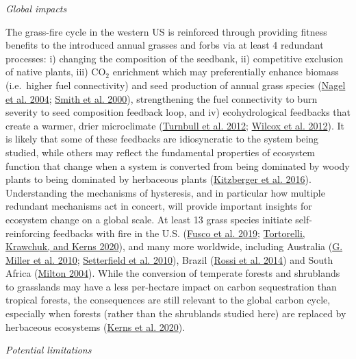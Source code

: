 \documentclass[
  12pt,
]{article}
\begin{document}
\emph{Global impacts}

The grass-fire cycle in the western US is reinforced through providing
fitness benefits to the introduced annual grasses and forbs via at least
4 redundant processes: i) changing the composition of the seedbank, ii)
competitive exclusion of native plants, iii) CO\(_2\) enrichment which
may preferentially enhance biomass (i.e.~higher fuel connectivity) and
seed production of annual grass species
(\protect\hyperlink{ref-Nagel2004}{Nagel et al. 2004};
\protect\hyperlink{ref-Smith2000}{Smith et al. 2000}), strengthening the
fuel connectivity to burn severity to seed composition feedback loop,
and iv) ecohydrological feedbacks that create a warmer, drier
microclimate (\protect\hyperlink{ref-Turnbull2012}{Turnbull et al.
2012}; \protect\hyperlink{ref-Wilcox2012}{Wilcox et al. 2012}). It is
likely that some of these feedbacks are idiosyncratic to the system
being studied, while others may reflect the fundamental properties of
ecosystem function that change when a system is converted from being
dominated by woody plants to being dominated by herbaceous plants
(\protect\hyperlink{ref-Kitzberger2016}{Kitzberger et al. 2016}).
Understanding the mechanisms of hysteresis, and in particular how
multiple redundant mechanisms act in concert, will provide important
insights for ecosystem change on a global scale. At least 13 grass
species initiate self-reinforcing feedbacks with fire in the U.S.
(\protect\hyperlink{ref-Fusco2019}{Fusco et al. 2019};
\protect\hyperlink{ref-Tortorelli2020}{Tortorelli, Krawchuk, and Kerns
2020}), and many more worldwide, including Australia
(\protect\hyperlink{ref-Miller2010}{G. Miller et al. 2010};
\protect\hyperlink{ref-Setterfield2010}{Setterfield et al. 2010}),
Brazil (\protect\hyperlink{ref-Rossi2014}{Rossi et al. 2014}) and South
Africa (\protect\hyperlink{ref-Milton2004}{Milton 2004}). While the
conversion of temperate forests and shrublands to grasslands may have a
less per-hectare impact on carbon sequestration than tropical forests,
the consequences are still relevant to the global carbon cycle,
especially when forests (rather than the shrublands studied here) are
replaced by herbaceous ecosystems
(\protect\hyperlink{ref-Kerns2020}{Kerns et al. 2020}).

\emph{Potential limitations}
\end{document}
